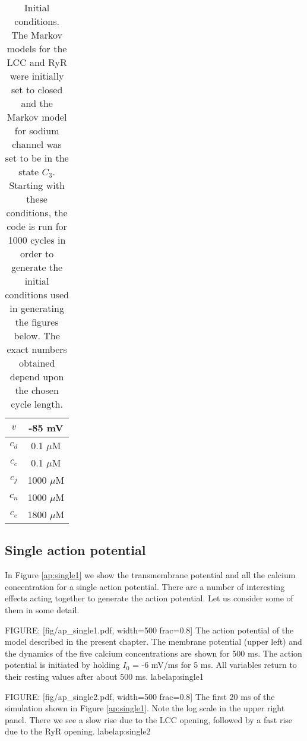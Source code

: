 \begin{table}
\begin{center}
\begin{tabular}{|c|c|} \hline
$v$ & -85 mV \\ \hline
$c_{d}$ & 0.1 $\mu$M \\ \hline
$c_{c}$ & 0.1 $\mu$M \\ \hline
$c_{j}$ & 1000 $\mu$M \\ \hline
$c_{n}$ & 1000 $\mu$M \\ \hline
$c_{e}$ & 1800 $\mu$M \\ \hline
\end{tabular}
\caption{Initial conditions. The Markov models for the LCC and RyR were initially set to closed and the Markov model for sodium channel was set to be in the state $C_3$. Starting with these conditions, the code is run for 1000 cycles in order to generate the initial conditions used in generating the figures below. The exact numbers obtained depend upon the chosen cycle length. \label{tab:init}}
\end{center}
\end{table}





\subsection{Single action potential}

In Figure \ref{ap:single1} we show the transmembrane potential and all the calcium concentration for a single action potential. There are a number of interesting effects acting together to generate the action potential. Let us consider some of them in some detail.

FIGURE: [fig/ap_single1.pdf, width=500 frac=0.8] The action potential of the model described in the present chapter. The membrane potential (upper left) and the dynamics of the five calcium concentrations are shown for 500 ms. The action potential is initiated by holding $I_0$ = -6 mV/ms for 5 ms. All variables return to their resting values after about 500 ms.  label{ap:single1}

FIGURE: [fig/ap_single2.pdf, width=500 frac=0.8] The first 20 ms of the simulation shown in Figure \ref{ap:single1}. Note the log scale in the upper right panel. There we see a slow rise due to the LCC opening, followed by a fast rise due to the RyR opening. label{ap:single2}

